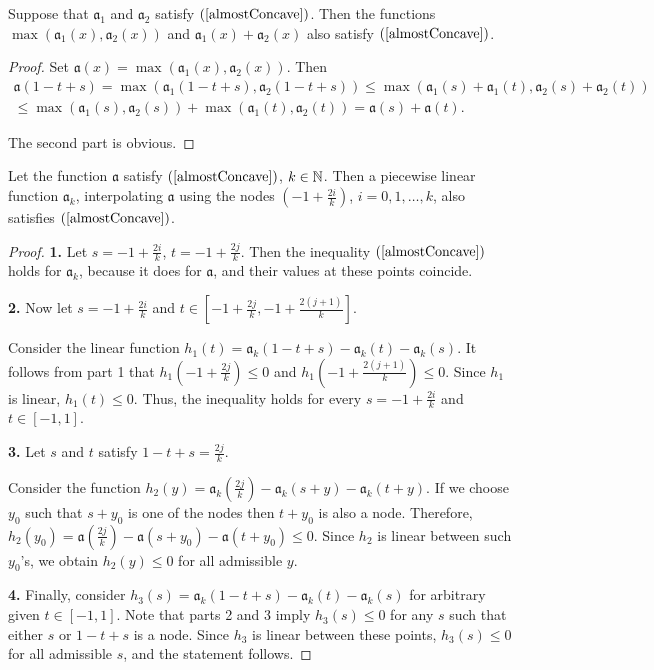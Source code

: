 \begin{lm}
\label{maxSumConcave}
Suppose that $\mathfrak a_1$ and $\mathfrak a_2$ satisfy $(\ref{almostConcave})$.
Then the functions $\max (\mathfrak a_1(x), \mathfrak a_2(x))$ and $\mathfrak a_1(x) + \mathfrak a_2(x)$ also satisfy $(\ref{almostConcave})$.
\end{lm}
\begin{proof}
Set $\mathfrak a(x) = \max (\mathfrak a_1(x), \mathfrak a_2(x))$. Then
\begin{multline*}
\mathfrak a(1 - t + s) = \max(\mathfrak a_1( 1 - t + s), \mathfrak a_2(1 - t + s)) \le
\max(\mathfrak a_1(s) + \mathfrak a_1(t), \mathfrak a_2(s) + \mathfrak a_2(t)) \\
\le \max(\mathfrak a_1(s), \mathfrak a_2(s)) + \max(\mathfrak a_1(t), \mathfrak a_2(t)) =
\mathfrak a(s) + \mathfrak a(t).
\end{multline*}

The second part is obvious.
\end{proof}

\begin{lm}
\label{piecewiseLinearConcave}
Let the function $\mathfrak a$ satisfy $(\ref{almostConcave})$, $k \in \mathbb N$.
Then a piecewise linear function $\mathfrak a_k$,
interpolating $\mathfrak a$ using the nodes
$(-1 + \frac{2i}{k})$, $i = 0, 1, \dots, k$,
also satisfies $(\ref{almostConcave})$.
\end{lm}
\begin{proof}
{\bf 1.}
Let $s = -1 + \frac{2i}{k}$, $t = -1 + \frac{2j}{k}$.
Then the inequality $(\ref{almostConcave})$ holds for $\mathfrak a_k$, because it does for $\mathfrak a$,
and their values at these points coincide.

{\bf 2.}
Now let $s = -1 + \frac{2i}{k}$ and $t \in [-1 + \frac{2j}{k}, -1 + \frac{2(j + 1)}{k}]$.

Consider the linear function $h_1(t) = \mathfrak a_k( 1 - t + s ) - \mathfrak a_k(t) - \mathfrak a_k(s)$.
It follows from part 1 that $h_1(-1 + \frac{2j}{k}) \le 0$ and $h_1(-1 + \frac{2(j + 1)}{k}) \le 0$.
Since $h_1$ is linear, $h_1(t) \le 0$.
Thus, the inequality holds for every $s = -1 + \frac{2i}{k}$ and $t \in [-1, 1]$.

{\bf 3.}
Let $s$ and $t$ satisfy $1 - t + s = \frac{2j}{k}$.

Consider the function $h_2(y) = \mathfrak a_k(\frac{2j}{k}) - \mathfrak a_k(s + y) - \mathfrak a_k(t + y)$.
If we choose $y_0$ such that $s + y_0$ is one of the nodes then $t + y_0$ is also a node.
Therefore, $h_2(y_0) = \mathfrak a(\frac{2j}{k}) - \mathfrak a(s + y_0) - \mathfrak a(t + y_0) \le 0$.
Since $h_2$ is linear between such $y_0$'s, we obtain $h_2(y) \le 0$ for all admissible $y$.

{\bf 4.}
Finally, consider $h_3(s) = \mathfrak a_k( 1 - t + s ) - \mathfrak a_k(t) - \mathfrak a_k(s)$ for arbitrary given $t \in [-1, 1]$.
Note that parts 2 and 3 imply $h_3(s) \le 0$ for any $s$
such that either $s$ or $1 - t + s$ is a node.
Since $h_3$ is linear between these points, $h_3(s) \le 0$ for all admissible $s$,
and the statement follows.
\end{proof}

